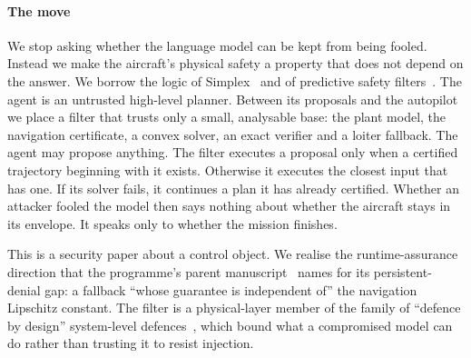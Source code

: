 \paragraph{The move} We stop asking whether the language model can be kept
from being fooled. Instead we make the aircraft's physical safety a
property that does not depend on the answer. We borrow the logic of
Simplex~\cite{seto1998simplex,sha2001simplex} and of predictive safety
filters~\cite{wabersich2021psf,wabersich2023datadriven}. The agent is an
untrusted high-level planner. Between its proposals and the autopilot we
place a filter that trusts only a small, analysable base: the plant model,
the navigation certificate, a convex solver, an exact verifier and a loiter
fallback. The agent may propose anything. The filter executes a proposal
only when a certified trajectory beginning with it exists. Otherwise it
executes the closest input that has one. If its solver fails, it continues
a plan it has already certified. Whether an attacker fooled the model then
says nothing about whether the aircraft stays in its envelope. It speaks
only to whether the mission finishes.

This is a security paper about a control object. We realise the
runtime-assurance direction that the programme's parent
manuscript~\cite{parentpaper} names for its persistent-denial gap: a
fallback ``whose guarantee is independent of'' the navigation Lipschitz
constant. The filter is a physical-layer member of the family of
``defence by design'' system-level
defences~\cite{debenedetti2025camel,costa2025fides,beurerkellner2025patterns},
which bound what a compromised model can do rather than trusting it to
resist injection.

